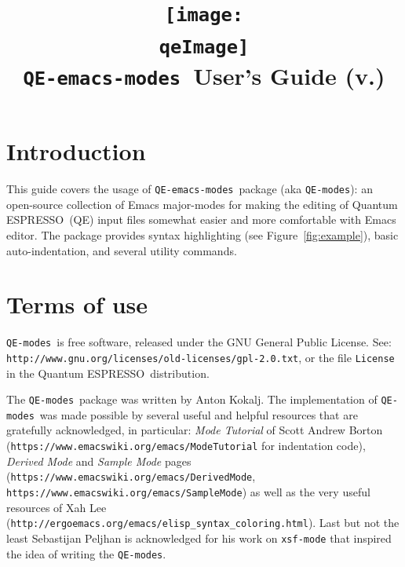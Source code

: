 \documentclass[12pt,a4paper]{article}
\def\qe{{\sc Quantum ESPRESSO}}
\def\QEmodes{\texttt{QE-modes}}
\def\QEemodes{\texttt{QE-emacs-modes}}
\begin{document}
 
\author{}
\date{}

\def\qeImage{../../../Doc/quantum_espresso.pdf}

\title{
  \texttt{[image: \\qeImage]} \\
  \Huge \QEemodes\ User's Guide (v.\version) 
}

\maketitle

\tableofcontents

\section{Introduction}

This guide covers the usage of \QEemodes\ package (aka \QEmodes): an
open-source collection of Emacs major-modes for making the editing of
\qe\ (QE) input files somewhat easier and more comfortable with Emacs
editor. The package provides syntax highlighting (see
Figure~\ref{fig:example}), basic auto-indentation, and several utility
commands.

\section{Terms of use}

\QEmodes\ is free software, released under the
GNU General Public License. See:
\texttt{http://www.gnu.org/licenses/old-licenses/gpl-2.0.txt}, or the
file \texttt{License} in the \qe\ distribution.

The \QEmodes\ package was written by Anton Kokalj. The implementation
of \QEmodes\ was made possible by several useful and helpful resources
that are gratefully acknowledged, in particular: {\it Mode Tutorial}
of Scott Andrew Borton
(\texttt{https://www.emacswiki.org/emacs/ModeTutorial} for
indentation code), {\it Derived Mode} and {\it Sample Mode} pages
(\texttt{https://www.emacswiki.org/emacs/DerivedMode},
\texttt{https://www.emacswiki.org/emacs/SampleMode}) as well as the
very useful resources of Xah Lee
(\texttt{http://ergoemacs.org/emacs/elisp\_syntax\_coloring.html}). Last
but not the least Sebastijan Peljhan is acknowledged for his work on
\texttt{xsf-mode} that inspired the idea of writing the \QEmodes.

\end{document}
